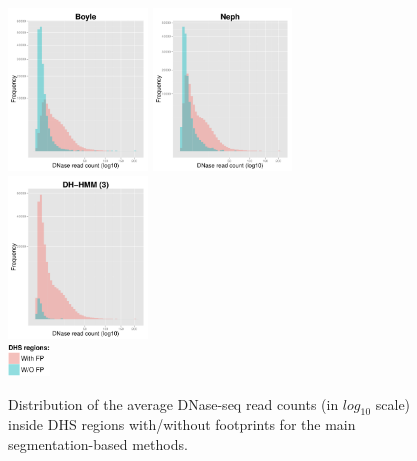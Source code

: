 \documentclass{bioinfo}
\begin{document}
\begin{figure}[t]
\centering
     \includegraphics[width=0.33\textwidth]{Figs/DHS_Histogram_Boyle}
     \includegraphics[width=0.33\textwidth]{Figs/DHS_Histogram_Neph}
     \includegraphics[width=0.33\textwidth]{Figs/DHS_Histogram_DHHMM3} \\
     \vspace{4mm}
     \includegraphics[width=0.1\textwidth]{Figs/DHS_Histogram_Legend}
\caption{{\color{black} Distribution of the average DNase-seq read counts (in $log_10$ scale) inside DHS regions with/without footprints for the main segmentation-based methods.}}
\label{fig:dhs.histogram}
\end{figure}

\end{document}
